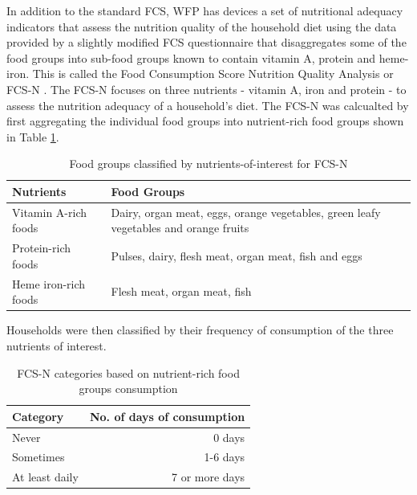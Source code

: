 \documentclass[12pt,a4paper]{article}
\begin{document}
In addition to the standard FCS, WFP has devices a set of nutritional adequacy indicators that assess the nutrition quality of the household diet using the data provided by a slightly modified FCS questionnaire that disaggregates some of the food groups into sub-food groups known to contain vitamin A, protein and heme-iron. This is called the Food Consumption Score Nutrition Quality Analysis or FCS-N \citep{WorldFoodProgramme:2015tn}. The FCS-N focuses on three nutrients - vitamin A, iron and protein - to assess the nutrition adequacy of a household's diet. The FCS-N was calcualted by first aggregating the individual food groups into nutrient-rich food groups shown in Table \ref{tab:fcs3}.

\begin{table}[H]

\caption{\label{tab:fcs3}Food groups classified by nutrients-of-interest for FCS-N}
\centering
\begin{tabular}[t]{l>{\raggedright\arraybackslash}p{8cm}}
\toprule
\textbf{Nutrients} & \textbf{Food Groups}\\
\midrule
\rowcolor{gray!6}  Vitamin A-rich foods & Dairy, organ meat, eggs, orange vegetables, green leafy vegetables and orange fruits\\
Protein-rich foods & Pulses, dairy, flesh meat, organ meat, fish and eggs\\
\rowcolor{gray!6}  Heme iron-rich foods & Flesh meat, organ meat, fish\\
\bottomrule
\end{tabular}
\end{table}

Households were then classified by their frequency of consumption of the three nutrients of interest.

\begin{table}[H]

\caption{\label{tab:fcs4}FCS-N categories based on nutrient-rich food groups consumption}
\centering
\begin{tabular}[t]{lr}
\toprule
\textbf{Category} & \textbf{No. of days of consumption}\\
\midrule
\rowcolor{gray!6}  Never & 0 days\\
Sometimes & 1-6 days\\
\rowcolor{gray!6}  At least daily & 7 or more days\\
\bottomrule
\end{tabular}
\end{table}
\end{document}
